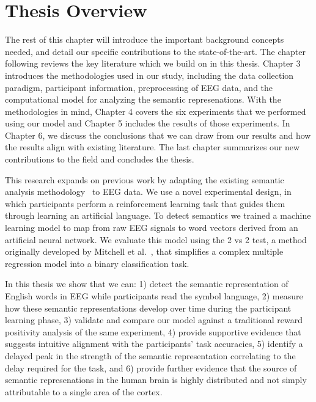 \section{Thesis Overview}

The rest of this chapter will introduce the important background concepts 
needed, and detail our specific contributions to the state-of-the-art. The 
chapter following reviews the key literature which we build on in this thesis.  
Chapter 3 introduces the methodologies used in our study, including the data 
collection paradigm, participant information, preprocessing of EEG data, and 
the computational model for analyzing the semantic represenations. With the 
methodologies in mind, Chapter 4 covers the six experiments that we performed 
using our model and Chapter 5 includes the results of those experiments. In 
Chapter 6, we discuss the conclusions that we can draw from our results and how 
the results align with existing literature. The last chapter summarizes our new 
contributions to the field and concludes the thesis.

This research expands on previous work by adapting the existing semantic 
analysis methodology~\cite{Mitchell2008,Sudre2012} to EEG data.  We use a novel 
experimental design, in which participants perform a reinforcement learning 
task that guides them through learning an artificial language. To detect 
semantics we trained a machine learning model to map from raw EEG signals to 
word vectors derived from an artificial neural network. We evaluate this model 
using the 2 vs 2 test, a method originally developed by Mitchell et 
al.~\cite{Mitchell2008}, that simplifies a complex multiple regression model 
into a binary classification task.

In this thesis we show that we can: 1) detect the semantic representation of 
English words in EEG while participants read the symbol language, 2) measure 
how these semantic representations develop over time during the participant 
learning phase, 3) validate and compare our model against a traditional reward 
positivity analysis of the same experiment, 4) provide supportive evidence that 
suggests intuitive alignment with the participants' task accuracies, 5) 
identify a delayed peak in the strength of the semantic representation 
correlating to the delay required for the task, and 6) provide further evidence 
that the source of semantic represenations in the human brain is highly 
distributed and not simply attributable to a single area of the cortex.
